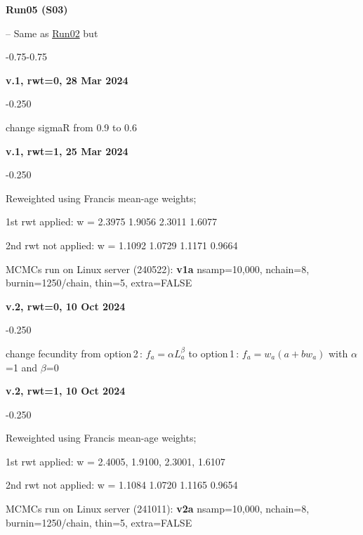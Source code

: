 \hypertarget{R05}{\textbf{Run05 (S03)}} -- Same as \hyperlink{R02}{Run02} but
\begin{itemize_csas}{-0.75}{-0.75}
	\item \textbf{v.1, rwt=0, 28 Mar 2024}
	\begin{itemize_csas}{-0.25}{0}
		\item change sigmaR from 0.9 to 0.6
	\end{itemize_csas}
	\item \textbf{v.1, rwt=1, 25 Mar 2024}
	\begin{itemize_csas}{-0.25}{0}
		\item Reweighted using Francis mean-age weights;
		\item 1st rwt applied: w = 2.3975  1.9056  2.3011  1.6077
		\item 2nd rwt not applied: w = 1.1092  1.0729  1.1171  0.9664
		\item MCMCs run on Linux server (240522): \textbf{v1a} nsamp=10,000, nchain=8, burnin=1250/chain, thin=5, extra=FALSE
	\end{itemize_csas}
	\item \textbf{v.2, rwt=0, 10 Oct 2024}
	\begin{itemize_csas}{-0.25}{0}
		\item change fecundity from option\,2\,: $f_a = \alpha L_a^{\beta}$ to option\,1\,:  $f_a = w_a (a + b w_a)$ with $\alpha$=1 and $\beta$=0
	\end{itemize_csas}
	\item \textbf{v.2, rwt=1, 10 Oct 2024}
	\begin{itemize_csas}{-0.25}{0}
		\item Reweighted using Francis mean-age weights;
		\item 1st rwt applied: w = 2.4005, 1.9100, 2.3001, 1.6107
		\item 2nd rwt not applied: w = 1.1084 1.0720 1.1165 0.9654
		\item MCMCs run on Linux server (241011): \textbf{v2a} nsamp=10,000, nchain=8, burnin=1250/chain, thin=5, extra=FALSE
	\end{itemize_csas}
\end{itemize_csas}

